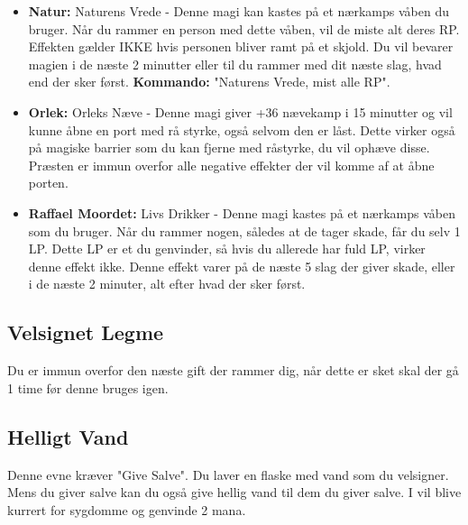 \begin{itemize}
    \item \textbf{Natur:} Naturens Vrede - Denne magi kan kastes på et nærkamps våben du bruger. Når du rammer en person med dette våben, vil de miste alt deres RP. Effekten gælder IKKE hvis personen bliver ramt på et skjold. Du vil bevarer magien i de næste 2 minutter eller til du rammer med dit næste slag, hvad end der sker først. \textbf{Kommando:} "Naturens Vrede, mist alle RP".
    \item \textbf{Orlek:} Orleks Næve - Denne magi giver +36 nævekamp i 15 minutter og vil kunne åbne en port med rå styrke, også selvom den er låst. Dette virker også på magiske barrier som du kan fjerne med råstyrke, du vil ophæve disse. Præsten er immun overfor alle negative effekter der vil komme af at åbne porten.
    \item \textbf{Raffael Moordet:} Livs Drikker -  Denne magi kastes på et nærkamps våben som du bruger. Når du rammer nogen, således at de tager skade, får du selv 1 LP. Dette LP er et du genvinder, så hvis du allerede har fuld LP, virker denne effekt ikke. Denne effekt varer på de næste 5 slag der giver skade, eller i de næste 2 minuter, alt efter hvad der sker først.
\end{itemize}

\subsection{Velsignet Legme}
Du er immun overfor den næste gift der rammer dig, når dette er sket skal der gå 1 time før denne bruges igen. 

\subsection{Helligt Vand}
Denne evne kræver "Give Salve". Du laver en flaske med vand som du velsigner. Mens du giver salve kan du også give hellig vand til dem du giver salve. I vil blive kurrert for sygdomme og genvinde 2 mana.
